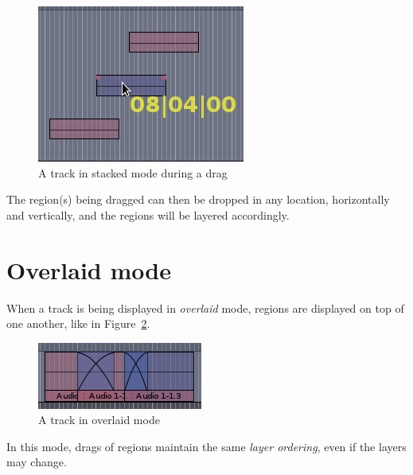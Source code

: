 \documentclass{article}
\begin{document}
\begin{figure}[ht]
\begin{center}
\includegraphics[scale=0.5]{stacked-drag.png}
\end{center}
\caption{A track in stacked mode during a drag}
\label{fig:stacked-drag}
\end{figure}

The region(s) being dragged can then be dropped in any location, horizontally
and vertically, and the regions will be layered accordingly.


\section{Overlaid mode}

When a track is being displayed in \emph{overlaid} mode, regions are
displayed on top of one another, like in Figure~\ref{fig:overlaid}.

\begin{figure}[ht]
\begin{center}
\includegraphics[scale=0.5]{overlaid.png}
\end{center}
\caption{A track in overlaid mode}
\label{fig:overlaid}
\end{figure}

In this mode, drags of regions maintain the same \emph{layer ordering}, even if the layers may
change.
\end{document}
